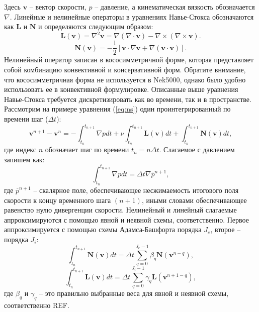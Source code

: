 Здесь $\textbf{v}$ -- вектор скорости, $p$ -- давление, а кинематическая вязкость обозначается $\nabla$. 
%
Линейные и нелинейные операторы в уравнениях Навье-Стокса обозначаются как $\textbf{L}$ и $\textbf{N}$ 
и определяются следующим образом:
%
\begin{equation}\label{eq:linear}
    \textbf{L} (\textbf{v}) = \nabla^2 \textbf{v} = \nabla(\nabla \cdot \textbf{v}) - 
    \nabla \times (\nabla \times \textbf{v}).
\end{equation}
%
\begin{equation}\label{eq:nonlin}
    \textbf{N} (\textbf{v}) = - \frac{1}{2}[\textbf{v} \cdot \nabla \textbf{v} + 
    \nabla (\textbf{v} \cdot \textbf{v})]. 
\end{equation}
%
Нелинейный оператор записан в кососимметричной форме, которая представляет собой 
комбинацию конвективной и консервативной форм. 
%
Обратите внимание, что кососимметричная форма не используется в Nek5000, однако 
было удобно использовать ее в конвективной формулировке. 
%
Описанные выше уравнения Навье-Стокса требуется дискретизировать как во времени, так и в пространстве. 
%
Рассмотрим на примере уравнения (\ref{eq:ns}) один проинтегрированный по времени шаг ($\Delta t$):
%
\begin{equation}\label{eq:tstep}
    \textbf{v}^{n+1} - \textbf{v}^n = - \int^{t_{n+1}}_{t_n} \nabla p dt + 
    \nu  \int^{t_{n+1}}_{t_n} \textbf{L} (\textbf{v}) dt + \int^{t_{n+1}}_{t_n} \textbf{N} (\textbf{v}) dt, 
\end{equation}
%
где индекс $n$ обозначает шаг по времени $t_n = n \Delta t$.
%
Слагаемое с давлением запишем как:
%
\begin{equation}\label{eq:pres}
    \int^{t_{n+1}}_{t_n} \nabla p dt = \Delta t \nabla \overline{p}^{n+1},
\end{equation}        
%
где $\overline{p}^{n+1}$ -- скалярное поле, обеспечивающее несжимаемость итогового поля скорости 
к концу временного шага $(n+1)$, иными словами обеспечивающее равенство нулю дивергенции скорости.
%
Нелинейный и линейный слагаемые апрроксимируются с помощью явной и неявной схемы, соответственно.
%
Первое аппроксимируется с помощью схемы Адамса-Башфорта порядка $J_e$,
второе -- порядка $J_i$:
%
\begin{equation}\label{eq:pres}
    \int^{t_{n+1}}_{t_n} \textbf{N} (\textbf{v}) dt = \Delta t \sum_{q=0}^{J_e - 1} \beta_q \textbf{N} (\textbf{v}^{n-q}) ,
\end{equation}        
%
%
\begin{equation}\label{eq:pres}
    \int^{t_{n+1}}_{t_n} \textbf{L} (\textbf{v}) dt = \Delta t \sum_{q=0}^{J_i - 1} \gamma_q \textbf{L} (\textbf{v}^{n+1-q}) ,
\end{equation}        
%
где $\beta_q$ и $\gamma_q$ -- это правильно выбранные веса для явной и неявной схемы, соответственно REF.
%


